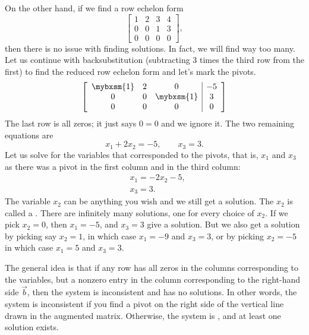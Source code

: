 On the other hand, if we find a row echelon form
\begin{equation*}
\left[
\begin{array}{ccc|c}
1 & 2 & 3 & 4 \\
0 & 0 & 1 & 3 \\
0 & 0 & 0 & 0 
\end{array}
\right] ,
\end{equation*}
then there is no issue with finding solutions.  In fact, we will find way too
many.  Let us continue with backsubstitution (subtracting 3 times the third
row from the first) to find the reduced row echelon form and let's mark the
pivots.
\begin{equation*}
\left[
\begin{array}{ccc|c}
\mybxsm{1} & 2 & 0 & -5 \\
0 & 0 & \mybxsm{1} & 3 \\
0 & 0 & 0 & 0 
\end{array}
\right]
\end{equation*}
The last row is all zeros; it just says $0=0$ and we ignore it.
The two remaining equations are 
\begin{equation*}
x_1 + 2 x_2 = -5 , \qquad
x_3 = 3 .
\end{equation*}
Let us solve for the variables that corresponded to the
pivots, that is, $x_1$ and $x_3$ as there was a pivot in the first column
and in the third column:
\begin{align*}
& x_1 = - 2 x_2 -5 , \\
& x_3 = 3 .
\end{align*}
The variable $x_2$ can be anything you wish and we still get a solution.
The $x_2$ is called a \emph{}.
There are infinitely many solutions, one for every choice of $x_2$.
If we pick $x_2=0$,
then $x_1 = -5$, and $x_3 = 3$ give a solution.  But we also get a solution
by picking say $x_2 = 1$, in which case $x_1 = -9$ and $x_3 = 3$,
or by picking $x_2 = -5$ in which case $x_1 = 5$ and $x_3 = 3$.

\medskip

The general idea is that
if any row has all zeros in the columns corresponding to the
variables, but a nonzero entry in the column corresponding to the
right-hand side $\vec{b}$, then the system is inconsistent and has no solutions.
In other words, the system is inconsistent if you find a pivot on the right
side of the vertical line drawn in the augmented matrix.  Otherwise, the
system is \emph{}, and at least one solution exists.
\pagebreak[2]

